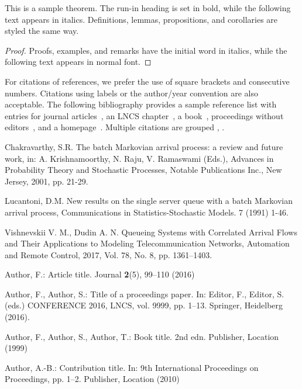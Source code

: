 \documentclass[runningheads]{llncs}
\begin{document}
\begin{theorem}
This is a sample theorem. The run-in heading is set in bold, while
the following text appears in italics. Definitions, lemmas,
propositions, and corollaries are styled the same way.
\end{theorem}
%
%
\begin{proof}
Proofs, examples, and remarks have the initial word in italics,
while the following text appears in normal font.
\end{proof}
For citations of references, we prefer the use of square brackets
and consecutive numbers. Citations using labels or the author/year
convention are also acceptable. The following bibliography provides
a sample reference list with entries for journal
articles~\cite{ref_article1}, an LNCS chapter~\cite{ref_lncs1}, a
book~\cite{ref_book1}, proceedings without editors~\cite{ref_proc1},
and a homepage~\cite{ref_url1}. Multiple citations are grouped
\cite{ref_article1,ref_lncs1,ref_book1},
\cite{ref_article1,ref_book1,ref_proc1,ref_url1}.
%
%
%
% 
% 
%
\begin{thebibliography}{8}

Chakravarthy, S.R. The batch Markovian arrival process: a
review and future work, in: A. Krishnamoorthy, N. Raju, V. Ramaswami (Eds.), {Advances in Probability Theory and Stochastic
Processes},   Notable Publications Inc., New Jersey, 2001, pp. 21-29.

   Lucantoni, D.M.  New results on the single server queue with a
batch Markovian arrival process, Communications in
Statistics-Stochastic Models. 7  (1991) 1-46.

 Vishnevskii V. M.,   Dudin A. N. Queueing Systems with Correlated Arrival Flows
and Their Applications to Modeling Telecommunication Networks, Automation and Remote Control, 2017, Vol. 78, No. 8, pp. 1361–1403.



Author, F.: Article title. Journal \textbf{2}(5), 99--110 (2016)

Author, F., Author, S.: Title of a proceedings paper. In: Editor,
F., Editor, S. (eds.) CONFERENCE 2016, LNCS, vol. 9999, pp. 1--13.
Springer, Heidelberg (2016).

Author, F., Author, S., Author, T.: Book title. 2nd edn. Publisher,
Location (1999)

Author, A.-B.: Contribution title. In: 9th International Proceedings
on Proceedings, pp. 1--2. Publisher, Location (2010)


\end{thebibliography}
\end{document}
